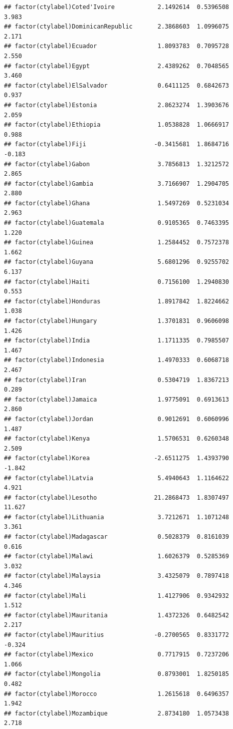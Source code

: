 \documentclass[12pt]{article}\usepackage[]{graphicx}\usepackage[]{color}
\makeatletter
\newenvironment{kframe}{%
 \def\at@end@of@kframe{}%
 \ifinner\ifhmode%
  \def\at@end@of@kframe{\end{minipage}}%
  \begin{minipage}{\columnwidth}%
 \fi\fi%
 \def\FrameCommand##1{\hskip\@totalleftmargin \hskip-\fboxsep
 \colorbox{shadecolor}{##1}\hskip-\fboxsep
     \hskip-\linewidth \hskip-\@totalleftmargin \hskip\columnwidth}%
 \MakeFramed {\advance\hsize-\width
   \@totalleftmargin\z@ \linewidth\hsize
   \@setminipage}}%
 {\par\unskip\endMakeFramed%
 \at@end@of@kframe}
\newenvironment{knitrout}{}{} %
\makeatother
\begin{document}
\begin{knitrout}
\begin{kframe}
\begin{verbatim}
## factor(ctylabel)Coted'Ivoire            2.1492614  0.5396508   3.983
## factor(ctylabel)DominicanRepublic       2.3868603  1.0996075   2.171
## factor(ctylabel)Ecuador                 1.8093783  0.7095728   2.550
## factor(ctylabel)Egypt                   2.4389262  0.7048565   3.460
## factor(ctylabel)ElSalvador              0.6411125  0.6842673   0.937
## factor(ctylabel)Estonia                 2.8623274  1.3903676   2.059
## factor(ctylabel)Ethiopia                1.0538828  1.0666917   0.988
## factor(ctylabel)Fiji                   -0.3415681  1.8684716  -0.183
## factor(ctylabel)Gabon                   3.7856813  1.3212572   2.865
## factor(ctylabel)Gambia                  3.7166907  1.2904705   2.880
## factor(ctylabel)Ghana                   1.5497269  0.5231034   2.963
## factor(ctylabel)Guatemala               0.9105365  0.7463395   1.220
## factor(ctylabel)Guinea                  1.2584452  0.7572378   1.662
## factor(ctylabel)Guyana                  5.6801296  0.9255702   6.137
## factor(ctylabel)Haiti                   0.7156100  1.2940830   0.553
## factor(ctylabel)Honduras                1.8917842  1.8224662   1.038
## factor(ctylabel)Hungary                 1.3701831  0.9606098   1.426
## factor(ctylabel)India                   1.1711335  0.7985507   1.467
## factor(ctylabel)Indonesia               1.4970333  0.6068718   2.467
## factor(ctylabel)Iran                    0.5304719  1.8367213   0.289
## factor(ctylabel)Jamaica                 1.9775091  0.6913613   2.860
## factor(ctylabel)Jordan                  0.9012691  0.6060996   1.487
## factor(ctylabel)Kenya                   1.5706531  0.6260348   2.509
## factor(ctylabel)Korea                  -2.6511275  1.4393790  -1.842
## factor(ctylabel)Latvia                  5.4940643  1.1164622   4.921
## factor(ctylabel)Lesotho                21.2868473  1.8307497  11.627
## factor(ctylabel)Lithuania               3.7212671  1.1071248   3.361
## factor(ctylabel)Madagascar              0.5028379  0.8161039   0.616
## factor(ctylabel)Malawi                  1.6026379  0.5285369   3.032
## factor(ctylabel)Malaysia                3.4325079  0.7897418   4.346
## factor(ctylabel)Mali                    1.4127906  0.9342932   1.512
## factor(ctylabel)Mauritania              1.4372326  0.6482542   2.217
## factor(ctylabel)Mauritius              -0.2700565  0.8331772  -0.324
## factor(ctylabel)Mexico                  0.7717915  0.7237206   1.066
## factor(ctylabel)Mongolia                0.8793001  1.8250185   0.482
## factor(ctylabel)Morocco                 1.2615618  0.6496357   1.942
## factor(ctylabel)Mozambique              2.8734180  1.0573438   2.718

\end{verbatim}
\end{kframe}
\end{knitrout}
\end{document}
